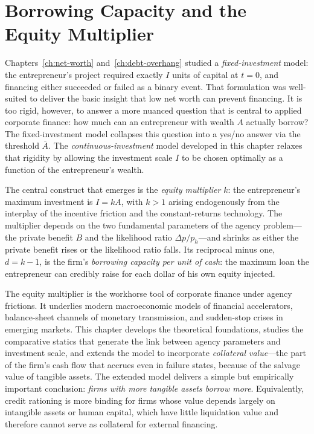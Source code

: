 \documentclass[11pt,a4paper,oneside]{book}
\theoremstyle{plain}
\theoremstyle{definition}
\theoremstyle{remark}
\numberwithin{equation}{chapter}
\begin{document}
\chapter{Borrowing Capacity and the Equity Multiplier}
\label{ch:equity-multiplier}

Chapters~\ref{ch:net-worth} and~\ref{ch:debt-overhang} studied a \emph{fixed-investment} model: the entrepreneur's project required exactly $I$ units of capital at $t=0$, and financing either succeeded or failed as a binary event.
That formulation was well-suited to deliver the basic insight that low net worth can prevent financing.
It is too rigid, however, to answer a more nuanced question that is central to applied corporate finance: how much can an entrepreneur with wealth $A$ actually borrow?
The fixed-investment model collapses this question into a yes/no answer via the threshold $\overline{A}$.
The \emph{continuous-investment} model developed in this chapter relaxes that rigidity by allowing the investment scale $I$ to be chosen optimally as a function of the entrepreneur's wealth.

The central construct that emerges is the \emph{equity multiplier} $k$: the entrepreneur's maximum investment is $I = k A$, with $k > 1$ arising endogenously from the interplay of the incentive friction and the constant-returns technology.
The multiplier depends on the two fundamental parameters of the agency problem---the private benefit $B$ and the likelihood ratio $\Delta p / p_h$---and shrinks as either the private benefit rises or the likelihood ratio falls.
Its reciprocal minus one, $d = k - 1$, is the firm's \emph{borrowing capacity per unit of cash}: the maximum loan the entrepreneur can credibly raise for each dollar of his own equity injected.

The equity multiplier is the workhorse tool of corporate finance under agency frictions.
It underlies modern macroeconomic models of financial accelerators, balance-sheet channels of monetary transmission, and sudden-stop crises in emerging markets.
This chapter develops the theoretical foundations, studies the comparative statics that generate the link between agency parameters and investment scale, and extends the model to incorporate \emph{collateral value}---the part of the firm's cash flow that accrues even in failure states, because of the salvage value of tangible assets.
The extended model delivers a simple but empirically important conclusion: \emph{firms with more tangible assets borrow more}.
Equivalently, credit rationing is more binding for firms whose value depends largely on intangible assets or human capital, which have little liquidation value and therefore cannot serve as collateral for external financing.
\end{document}
